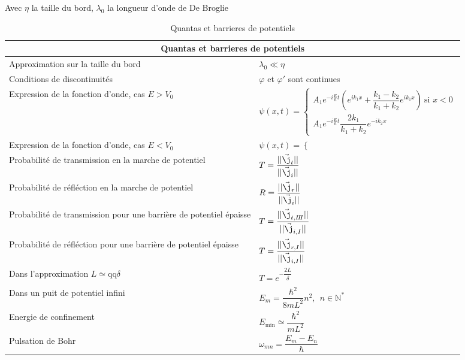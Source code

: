 \documentclass[10pt,a4paper,titlepage,landscape]{article}
\renewcommand{\arraystretch}{2}
\renewcommand{\phi}
{
    \varphi
}
\begin{document}
Avec $\eta$ la taille du bord, $\lambda_0$ la longueur d'onde de De Broglie
\begin{table}[H]
    \centering
    \renewcommand{\arraystretch}{1.5} %
    \setlength{\tabcolsep}{8pt} %
    \begin{tabular}{@{}|p{9cm}|p{10cm}@{}|}

        \multicolumn{2}{c}{\textbf{Quantas et barrieres de potentiels}} \\ \hline


        Approximation sur la taille du bord & $\lambda_0 \ll \eta$ \\ \hline
        Conditions de discontinuités & $\phi$ et $\phi'$ sont continues \\ \hline
        Expression de la fonction d'onde, cas $E > V_0$ & $\psi(x,t) = \left\{\begin{array}{l}A_1e^{-i\frac{E}{\hbar}t}\left(e^{ik_1x} + \dfrac{k_1-k_2}{k_1+k_2}e^{ik_1x}\right) \ \text{si } x < 0\\ \hline A_1 e^{-i\frac{E}{\hbar}t}\dfrac{2k_1}{k_1+k_2}e^{-ik_2x}\end{array}\right.$ \\ \hline
        Expression de la fonction d'onde, cas $E < V_0$ & $\psi(x,t) = \left\{\begin{array}{l}
        \end{array}\right.$ \\ \hline
        Probabilité de transmission en la marche de potentiel & $T = \dfrac{||\vec{\j}_t||}{||\vec{\j}_i||}$ \\ \hline
        Probabilité de réfléction en la marche de potentiel & $R = \dfrac{||\vec{\j}_r||}{||\vec{\j}_i||}$ \\ \hline
        Probabilité de transmission pour une barrière de potentiel épaisse & $T = \dfrac{||\vec{\j}_{t,I\!I\!I}||}{||\vec{\j}_{i,I}||}$ \\ \hline
        Probabilité de réfléction pour une barrière de potentiel épaisse & $T = \dfrac{||\vec{\j}_{r,I}||}{||\vec{\j}_{i,I}||}$ \\ \hline
        Dans l'approximation $L  \simeq  \text{qq} \delta$ & $T=e^{-\dfrac{2L}{\delta}}$ \\ \hline
        Dans un puit de potentiel infini & $E_m = \dfrac{\hbar^2}{8mL^2}n^2,\ \ n\in \mathbb{N^*}$ \\ \hline
        Energie de confinement & $E_{\text{min}} \simeq \dfrac{\hbar ^2}{mL^2}$ \\ \hline
        Pulsation de Bohr & $\omega_{mn} = \dfrac{E_m - E_n}{\hbar}$ \\ \hline


\end{tabular}
\caption{Quantas et barrieres de potentiels}
\label{tab:quantpos}
\end{table}
\end{document}
